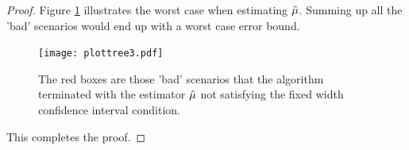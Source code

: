 \documentclass{iitthesis}
\theoremstyle{definition}
\begin{document}
\begin{proof}
Figure \ref{WorstcasemeanMCgproof} illustrates the worst case when estimating $\tilde{\mu}$. Summing up all the 'bad' scenarios would end up with a worst case error bound.
\begin{figure} 
\centering
\texttt{[image: plottree3.pdf]} 
\caption{The red boxes are those 'bad' scenarios that the algorithm terminated with the estimator $\hat{\mu}$ not satisfying the fixed width confidence interval condition.\label{WorstcasemeanMCgproof}}
\end{figure}
This completes the proof.

\end{proof}
\end{document}

